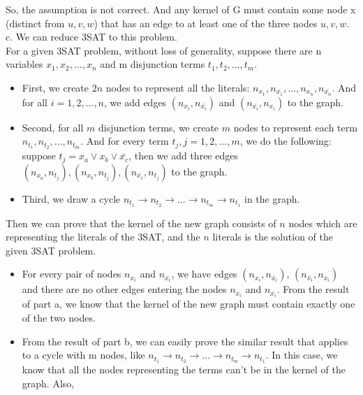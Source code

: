 \documentclass[12pt]{article}
\begin{document}
So, the assumption is not correct. And any kernel of G must contain some node x (distinct from $u, v, w$) that has an edge to at least one of the three nodes $u, v, w$. \\

c. We can reduce 3SAT to this problem. \\

For a given 3SAT problem, without loss of generality, suppose there are n variables $x_1, x_2, ..., x_n$ and m disjunction terms $t_1, t_2, ..., t_m$.

\begin{itemize}
\item First, we create $2n$ nodes to represent all the literals: $n_{x_1}, n_{\bar {x_1}}, ..., n_{x_n}, n_{\bar {x_n}}$. And for all $i = 1, 2, ..., n$, we add edges $(n_{x_i}, n_{\bar{x_i}})$ and $(n_{\bar{x_i}}, n_{x_i})$ to the graph.
\item Second, for all $m$ disjunction terms, we create $m$ nodes to represent each term $n_{t_1}, n_{t_2}, ..., n_{t_m}$. And for every term $t_j, j = 1, 2, ..., m$, we do the following: suppose $t_j = x_a \lor x_b \lor \bar {x_c}$, then we add three edges $(n_{x_a}, n_{t_j}), (n_{x_b}, n_{t_j}), (n_{\bar {x_c}}, n_{t_j})$ to the graph.
\item Third, we draw a cycle $n_{t_1} \to n_{t_2} \to ... \to n_{t_m} \to n_{t_1}$ in the graph.
\end{itemize}

Then we can prove that the kernel of the new graph consists of $n$ nodes which are representing the literals of the 3SAT, and the $n$ literals is the solution of the given 3SAT problem.

\begin{itemize}
\item For every pair of nodes $n_{x_i}$ and $n_{\bar {x_i}}$, we have edges $(n_{x_i}, n_{\bar{x_i}})$, $(n_{\bar{x_i}}, n_{x_i})$ and there are no other edges entering the nodes $n_{x_i}$ and $n_{\bar {x_i}}$. From the result of part a, we know that the kernel of the new graph must contain exactly one of the two nodes.
\item From the result of part b, we can easily prove the similar result that applies to a cycle with m nodes, like $n_{t_1} \to n_{t_2} \to ... \to n_{t_m} \to n_{t_1}$. In this case, we know that all the nodes representing the terms can't be in the kernel of the graph. Also, 
\end{itemize}
\end{document}
